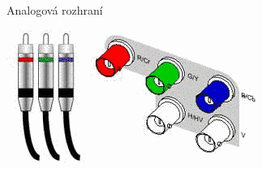 \documentclass[aspectratio=43]{beamer}
\begin{document}
\begin{frame}{Analogová rozhraní}
\begin{center}
\begin{minipage}{0.3\linewidth}
		\end{minipage}
		\hfill
		\begin{minipage}{0.3\linewidth}
			\centering
			\includegraphics[width=\linewidth]{extrahovane_obrazky/img_5_page4_3.png}
		\end{minipage}
	\end{center}
	
\end{frame}
\end{document}

